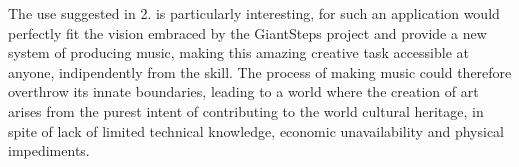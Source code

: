 The use suggested in 2. is particularly interesting, for such an application would perfectly fit the vision embraced by the GiantSteps project and provide a new system of producing music, making this amazing creative task accessible at anyone, indipendently from the skill. The process of making music could therefore overthrow its innate boundaries, leading to a world where the creation of art arises from the purest intent of contributing to the world cultural heritage, in spite of lack of limited technical knowledge, economic unavailability and physical impediments.